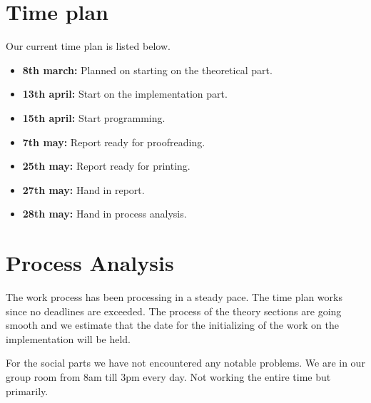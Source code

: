 \documentclass{article}
\begin{document}
\section{Time plan}
Our current time plan is listed below. 
\begin{itemize}
	\item \textbf{8th march:} Planned on starting on the theoretical part.
	\item \textbf{13th april:} Start on the implementation part.
	\item \textbf{15th april:} Start programming. 
	\item \textbf{7th may:} Report ready for proofreading.
	\item \textbf{25th may:} Report ready for printing.
	\item \textbf{27th may:} Hand in report.
	\item \textbf{28th may:} Hand in process analysis.
\end{itemize}


\section{Process Analysis}
The work process has been processing in a steady pace. The time plan works since no deadlines are exceeded. The process of the theory sections are going smooth and we estimate that the date for the initializing of the work on the implementation will be held. 

For the social parts we have not encountered any notable problems. We are in our group room from 8am till 3pm every day. Not working the entire time but primarily. 


\end{document}
